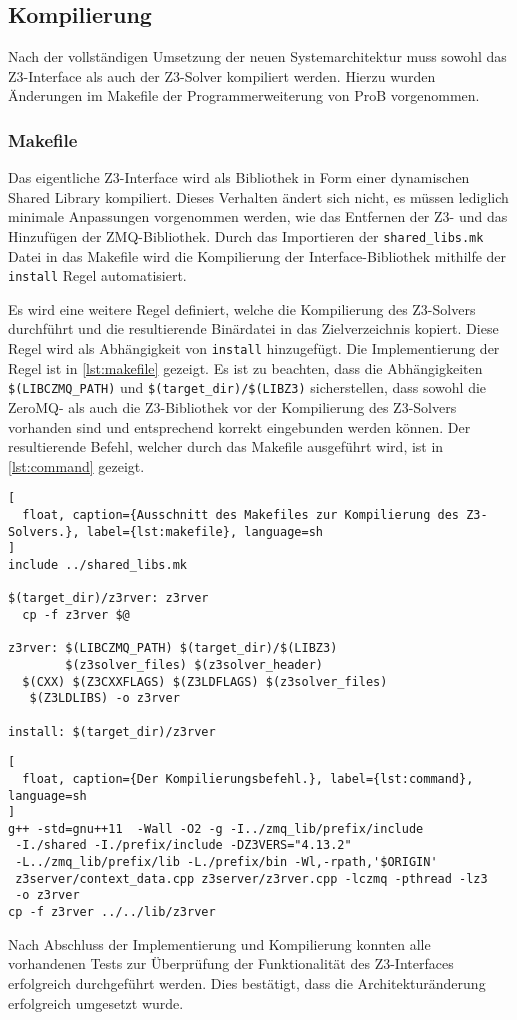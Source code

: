 \subsection{Kompilierung}

Nach der vollständigen Umsetzung der neuen Systemarchitektur muss sowohl das Z3-Interface als auch der Z3-Solver kompiliert werden.
Hierzu wurden Änderungen im Makefile der Programmerweiterung von ProB vorgenommen.

\subsubsection{Makefile}

Das eigentliche Z3-Interface wird als Bibliothek in Form einer dynamischen Shared Library kompiliert.
Dieses Verhalten ändert sich nicht, es müssen lediglich minimale Anpassungen vorgenommen werden, wie das Entfernen der Z3- und das Hinzufügen der ZMQ-Bibliothek.
Durch das Importieren der \texttt{shared\_libs.mk} Datei in das Makefile wird die Kompilierung der Interface-Bibliothek mithilfe der \texttt{install} Regel automatisiert.

Es wird eine weitere Regel definiert, welche die Kompilierung des Z3-Solvers durchführt und die resultierende Binärdatei in das Zielverzeichnis kopiert.
Diese Regel wird als Abhängigkeit von \texttt{install} hinzugefügt.
Die Implementierung der Regel ist in \cref{lst:makefile} gezeigt.
Es ist zu beachten, dass die Abhängigkeiten \texttt{\$(LIBCZMQ\_PATH)} und \texttt{\$(target\_dir)/\$(LIBZ3)} sicherstellen,
dass sowohl die ZeroMQ- als auch die Z3-Bibliothek vor der Kompilierung des Z3-Solvers vorhanden sind und entsprechend korrekt eingebunden werden können.
Der resultierende Befehl, welcher durch das Makefile ausgeführt wird, ist in \cref{lst:command} gezeigt.

\begin{lstlisting}[
  float, caption={Ausschnitt des Makefiles zur Kompilierung des Z3-Solvers.}, label={lst:makefile}, language=sh
]
include ../shared_libs.mk

$(target_dir)/z3rver: z3rver
  cp -f z3rver $@

z3rver: $(LIBCZMQ_PATH) $(target_dir)/$(LIBZ3)
        $(z3solver_files) $(z3solver_header)
  $(CXX) $(Z3CXXFLAGS) $(Z3LDFLAGS) $(z3solver_files)
   $(Z3LDLIBS) -o z3rver

install: $(target_dir)/z3rver
\end{lstlisting}

\begin{lstlisting}[
  float, caption={Der Kompilierungsbefehl.}, label={lst:command}, language=sh
]
g++ -std=gnu++11  -Wall -O2 -g -I../zmq_lib/prefix/include
 -I./shared -I./prefix/include -DZ3VERS="4.13.2"
 -L../zmq_lib/prefix/lib -L./prefix/bin -Wl,-rpath,'$ORIGIN'
 z3server/context_data.cpp z3server/z3rver.cpp -lczmq -pthread -lz3
 -o z3rver
cp -f z3rver ../../lib/z3rver
\end{lstlisting}

Nach Abschluss der Implementierung und Kompilierung konnten alle vorhandenen Tests zur Überprüfung der Funktionalität des Z3-Interfaces erfolgreich durchgeführt werden.
Dies bestätigt, dass die Architekturänderung erfolgreich umgesetzt wurde.
